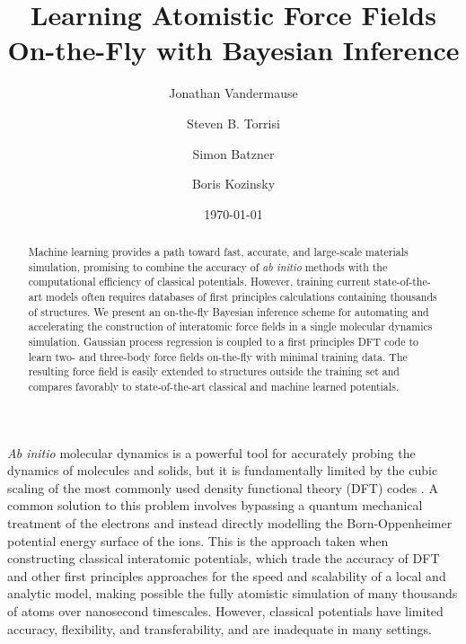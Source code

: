 \documentclass[%
reprint,
superscriptaddress,
amsmath,amssymb,
aps,
prl,
]{revtex4-1}
\begin{document}
\title{Learning Atomistic Force Fields On-the-Fly with Bayesian Inference}

\author{Jonathan Vandermause}

\author{Steven B. Torrisi}

\author{Simon Batzner}

\author{Boris Kozinsky}


\date{\today}

\begin{abstract}
  Machine learning provides a path toward fast, accurate, and large-scale materials simulation, promising to combine the accuracy of \textit{ab initio} methods with the computational efficiency of classical potentials. However, training current state-of-the-art models often requires databases of first principles calculations containing thousands of structures. We present an on-the-fly Bayesian inference scheme for automating and accelerating the construction of interatomic force fields in a single molecular dynamics simulation. Gaussian process regression is coupled to a first principles DFT code to learn two- and three-body force fields on-the-fly with minimal training data. The resulting force field is easily extended to structures outside the training set and compares favorably to state-of-the-art classical and machine learned potentials.
\end{abstract}

\maketitle

\textit{Ab initio} molecular dynamics is a powerful tool for
accurately probing the dynamics of molecules and solids, but it is fundamentally limited by the cubic scaling of the most commonly used density functional theory (DFT) codes \cite{kohn1999nobel}. A common solution to this problem involves bypassing a quantum mechanical treatment of the electrons and instead directly modelling the Born-Oppenheimer potential energy surface of the ions. This is the approach taken when constructing classical interatomic potentials, which trade the accuracy of DFT and other first principles approaches for the speed and scalability of a local and analytic model, making possible the fully atomistic simulation of many thousands of atoms over nanosecond timescales. However, classical potentials have limited accuracy, flexibility, and transferability, and are inadequate in many settings.
\end{document}

